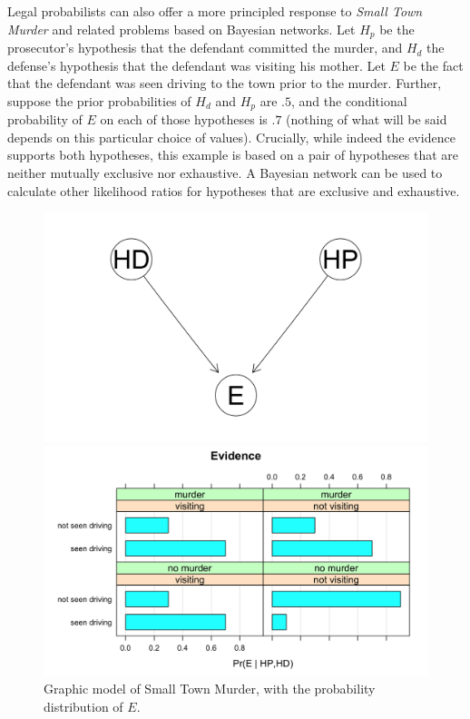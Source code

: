 \documentclass[
  10pt,
  dvipsnames,enabledeprecatedfontcommands]{scrartcl}
\begin{document}
Legal probabilists can also offer a more principled response to
\emph{Small Town Murder} and related problems based on Bayesian
networks. Let \(H_p\) be the prosecutor's hypothesis that the defendant
committed the murder, and \(H_d\) the defense's hypothesis that the
defendant was visiting his mother. Let \(E\) be the fact that the
defendant was seen driving to the town prior to the murder. Further,
suppose the prior probabilities of \(H_d\) and \(H_p\) are \(.5\), and
the conditional probability of \(E\) on each of those hypotheses is
\(.7\) (nothing of what will be said depends on this particular choice
of values). Crucially, while indeed the evidence supports both
hypotheses, this example is based on a pair of hypotheses that are
neither mutually exclusive nor exhaustive. A Bayesian network can be
used to calculate other likelihood ratios for hypotheses that are
exclusive and exhaustive.

\begin{figure}[h]
\begin{minipage}{0.4\textwidth}
\includegraphics{STMdag.png}
\end{minipage} \hfill \begin{minipage}{0.4\textwidth}
\includegraphics{STMpt.png}
\end{minipage}
\caption{Graphic model of Small Town Murder, with the  probability distribution of $E$.}
\label{fig:bayes_test4}
\end{figure}
\end{document}
